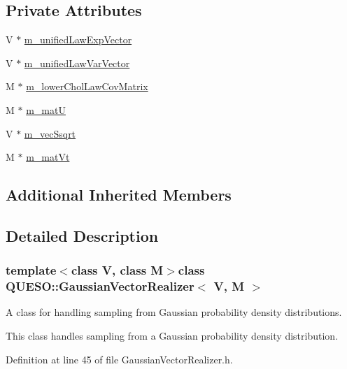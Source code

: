 \subsection*{Private Attributes}
\begin{DoxyCompactItemize}
\item 
V $\ast$ \hyperlink{class_q_u_e_s_o_1_1_gaussian_vector_realizer_ae1e6e0b9c268ced4a2192a9bcbd37668}{m\-\_\-unified\-Law\-Exp\-Vector}
\item 
V $\ast$ \hyperlink{class_q_u_e_s_o_1_1_gaussian_vector_realizer_a80276355d3e24953ed7be0749a554d85}{m\-\_\-unified\-Law\-Var\-Vector}
\item 
M $\ast$ \hyperlink{class_q_u_e_s_o_1_1_gaussian_vector_realizer_ac5cc90b95dddd02a987f45af652f4495}{m\-\_\-lower\-Chol\-Law\-Cov\-Matrix}
\item 
M $\ast$ \hyperlink{class_q_u_e_s_o_1_1_gaussian_vector_realizer_a62aebd74fe00824ceed9724b8c41cfa7}{m\-\_\-mat\-U}
\item 
V $\ast$ \hyperlink{class_q_u_e_s_o_1_1_gaussian_vector_realizer_a473a7c1e61dd0b311bb7da6c244cb53d}{m\-\_\-vec\-Ssqrt}
\item 
M $\ast$ \hyperlink{class_q_u_e_s_o_1_1_gaussian_vector_realizer_aa121afe8cf67cea2a52552b4d12d57b8}{m\-\_\-mat\-Vt}
\end{DoxyCompactItemize}
\subsection*{Additional Inherited Members}


\subsection{Detailed Description}
\subsubsection*{template$<$class V, class M$>$class Q\-U\-E\-S\-O\-::\-Gaussian\-Vector\-Realizer$<$ V, M $>$}

A class for handling sampling from Gaussian probability density distributions. 

This class handles sampling from a Gaussian probability density distribution. 

Definition at line 45 of file Gaussian\-Vector\-Realizer.\-h.



